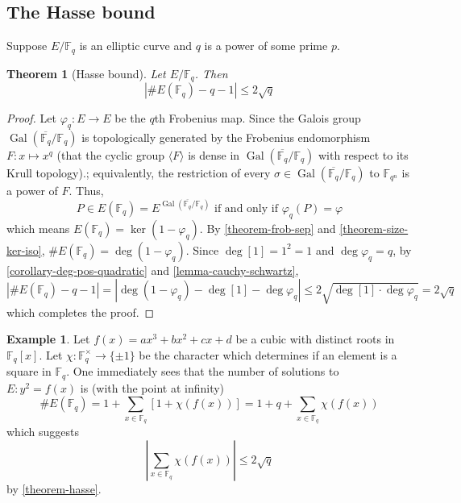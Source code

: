 \documentclass[12pt]{article}
\newtheorem{theorem}{Theorem}[subsection]
\theoremstyle{remark}
\theoremstyle{definition}
\newtheorem{example}{Example}[subsection]
\newcommand{\s}[0]{\sigma}
\newcommand{\F}[0]{\mathbb{F}}
\newcommand{\Gal}[0]{\operatorname{Gal}}
\begin{document}
    \subsection{The Hasse bound}\label{ssec-hasse-bound}
        Suppose $E/\F_q$ is an elliptic curve and $q$ is a power of some prime $p$.
        \begin{theorem}[Hasse bound]\label{theorem-hasse}
            Let $E/\F_q$. Then
            \[|\# E(\F_q)-q-1|\leqslant 2\sqrt{q}\]
        \end{theorem}
        \begin{proof}
            Let $\varphi_q:E\to E$ be the $q$th Frobenius map. Since the Galois group $\Gal(\overline{\F_q}/\F_q)$ is topologically generated by the Frobenius endomorphism $F:x\mapsto x^q$ (that the cyclic group $\langle F\rangle$ is dense in $\Gal(\overline{\F_q}/\F_q)$ with respect to its Krull topology).; equivalently, the restriction of every $\s\in\Gal(\overline{\F_q}/\F_q)$ to $\F_{q^n}$ is a power of $F$. Thus,
            \[P\in E(\F_q)=E^{\Gal(\overline{\F_q}/\F_q)}\text{ if and only if }\varphi_q(P)=\varphi\]
            which means $E(\F_q)=\ker(1-\varphi_q)$. By \autoref{theorem-frob-sep} and \autoref{theorem-size-ker-iso}, $\# E(\F_q)=\deg(1-\varphi_q)$. Since $\deg [1]=1^2=1$ and $\deg \varphi_q=q$, by \autoref{corollary-deg-pos-quadratic} and \autoref{lemma-cauchy-schwartz},
            \[|\# E(\F_q)-q-1|=|\deg(1-\varphi_q)-\deg[1]-\deg\varphi_q|\leqslant 2\sqrt{\deg[1]\cdot\deg\varphi_q}=2\sqrt{q}\]
            which completes the proof.
        \end{proof}
        \begin{example}
            Let $f(x)=ax^3+bx^2+cx+d$ be a cubic with distinct roots in $\F_q[x]$. Let $\chi:\F_q^\times\to\{\pm 1\}$ be the character which determines if an element is a square in $\F_q$. One immediately sees that the number of solutions to $E:y^2=f(x)$ is (with the point at infinity)
            \[\# E(\F_q)=1+\sum_{x\in \F_q}\left[1+\chi\left(f(x)\right)\right]=1+q+\sum_{x\in\F_q}\chi\left(f(x)\right)\]
            which suggests
            \[\left|\sum_{x\in\F_q}\chi\left(f(x)\right)\right|\leqslant 2\sqrt{q}\]
            by \autoref{theorem-hasse}.
        \end{example}
\end{document}
